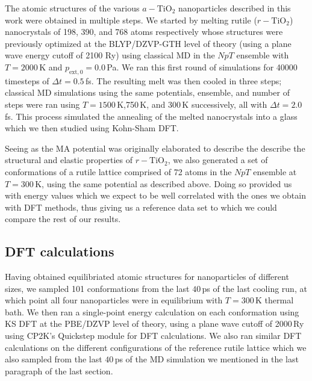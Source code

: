 \documentclass[aps,prb,twocolumn,amsmath,amssymb,superscriptaddress,longbibliography]{revtex4-1}
\newcommand\tab[1][1cm]{\hspace*{#1}} %
\begin{document}
\tab The atomic structures of the various $a-\text{TiO}_2$ nanoparticles described in this work were obtained in multiple steps.
We started by melting rutile ($r-\text{TiO}_2$) nanocrystals of 198, 390, and 768 atoms respectively whose structures were previously optimized at the BLYP/DZVP-GTH level of theory (using a plane wave energy cutoff of 2100 Ry) using classical MD in the $NpT$ ensemble with $T = 2000\,$K and $p_{\text{ext},0} = 0.0\,$Pa. 
We ran this first round of simulations for 40000 timesteps of $\Delta t = 0.5\,$fs.
The resulting melt was then cooled in three steps; classical MD simulations using the same potentials, ensemble, and number of steps were ran using $T = 1500\,$K,750$\,$K, and 300$\,$K successively, all with $\Delta t = 2.0\,$fs.
This process simulated the annealing of the melted nanocrystals into a glass which we then studied using Kohn-Sham DFT.

\tab Seeing as the MA potential was originally elaborated to describe the describe the structural and elastic properties of $r-\text{TiO}_2$, we also generated a set of conformations of a rutile lattice comprised of 72 atoms in the $NpT$ ensemble at $T = 300\,\text{K}$, using the same potential as described above.
Doing so provided us with energy values which we expect to be well correlated with the ones we obtain with DFT methods, thus giving us a reference data set to which we could compare the rest of our results.

\subsection{DFT calculations}

\tab Having obtained equilibriated atomic structures for nanoparticles of different sizes, we sampled 101 conformations from the last $40\,$ps of the last cooling run, at which point all four nanoparticles were in equilibrium with $T = 300\,\text{K}$ thermal bath.
We then ran a single-point energy calculation on each conformation using KS DFT at the PBE/DZVP level of theory, using a plane wave cutoff of 2000$\,$Ry using \textsc{CP2K}'s Quickstep module for DFT calculations\cite{quickstep}.
We also ran similar DFT calculations on the different configurations of the reference rutile lattice which we also sampled from the last $40\,$ps of the MD simulation we mentioned in the last paragraph of the last section.

\end{document}
